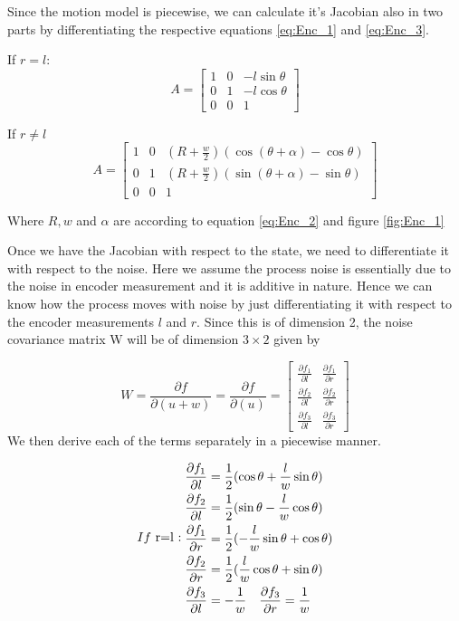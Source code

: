 Since the motion model is piecewise, we can calculate it's Jacobian also in two parts by differentiating the respective equations \ref{eq:Enc_1} and \ref{eq:Enc_3}.

If $ r = l $:
\begin{equation}
\label{eq:Enc_6}
A = 
\begin{bmatrix}
1 & 0 & -l\sin\theta\\
0 & 1 & -l\cos\theta\\
0 & 0 & 1
\end{bmatrix}
\end{equation}

If $ r \neq l $
\begin{equation}
\label{eq:Enc_7}
A = 
\begin{bmatrix}
1 & 0 & (R+\frac{w}{2})(\cos(\theta+\alpha)-\cos\theta)\\
0 & 1 & (R+\frac{w}{2})(\sin(\theta+\alpha)-\sin\theta)\\
0 & 0 & 1
\end{bmatrix}
\end{equation}

Where $ R,w $ and $ \alpha $ are according to equation \ref{eq:Enc_2} and figure \ref{fig:Enc_1}

Once we have the Jacobian with respect to the state, we need to differentiate it with respect to the noise. Here we assume the process noise is essentially due to the noise in encoder measurement and it is additive in nature. Hence we can know how the process moves with noise by just differentiating it with respect to the encoder measurements $ l $ and $ r $. Since this is of dimension 2, the noise covariance matrix W will be of dimension $ 3\times 2 $ given by

\begin{equation}
\label{eq:Enc_8}
W = \frac{\partial f}{\partial (u+w)} = \frac{\partial f}{\partial (u)} =
\begin{bmatrix}
\frac{\partial f_1}{\partial l} & \frac{\partial f_1}{\partial r}\\
\frac{\partial f_2}{\partial l} & \frac{\partial f_2}{\partial r}\\
\frac{\partial f_3}{\partial l} & \frac{\partial f_3}{\partial r}
\end{bmatrix} 
\end{equation}
 We then derive each of the terms separately in a piecewise manner.
 
\begin{subequations}
If $ r=l $:
	\begin{align}
		\frac{\partial f_1}{\partial l} &= \frac{1}{2}(\cos\theta+\frac{l}{w}\sin\theta)\\
		\frac{\partial f_2}{\partial l} &= \frac{1}{2}(\sin\theta-\frac{l}{w}\cos\theta)\\
		\frac{\partial f_1}{\partial r} &= \frac{1}{2}(-\frac{l}{w}\sin\theta+\cos\theta)\\
		\frac{\partial f_2}{\partial r} &= \frac{1}{2}(\frac{l}{w}\cos\theta+\sin\theta)\\
		\frac{\partial f_3}{\partial l} &= -\frac{1}{w} \quad \frac{\partial f_3}{\partial r} = \frac{1}{w}
	\end{align}
\end{subequations}

